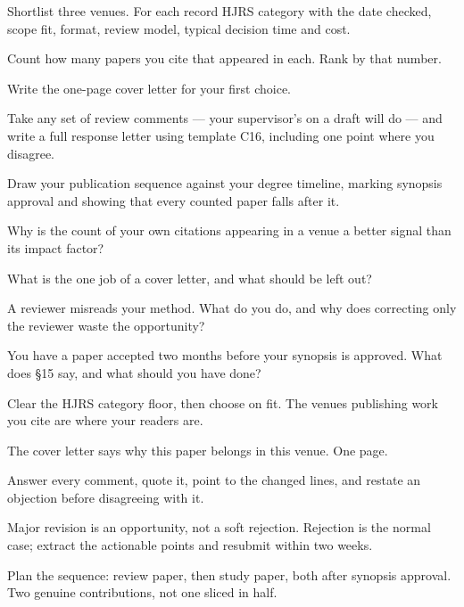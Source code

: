 \begin{lab}
\begin{tightnum}
  \item Shortlist three venues. For each record HJRS category with the date
    checked, scope fit, format, review model, typical decision time and cost.
  \item Count how many papers you cite that appeared in each. Rank by that
    number.
  \item Write the one-page cover letter for your first choice.
  \item Take any set of review comments --- your supervisor's on a draft will
    do --- and write a full response letter using template C16, including one
    point where you disagree.
  \item Draw your publication sequence against your degree timeline, marking
    synopsis approval and showing that every counted paper falls after it.
\end{tightnum}
\end{lab}

\begin{checkpoint}
\begin{tightnum}
  \item Why is the count of your own citations appearing in a venue a better
    signal than its impact factor?
  \item What is the one job of a cover letter, and what should be left out?
  \item A reviewer misreads your method. What do you do, and why does
    correcting only the reviewer waste the opportunity?
  \item You have a paper accepted two months before your synopsis is approved.
    What does \S15 say, and what should you have done?
\end{tightnum}
\end{checkpoint}

\begin{chaptersummary}
\begin{tight}
  \item Clear the HJRS category floor, then choose on fit. The venues
    publishing work you cite are where your readers are.
  \item The cover letter says why this paper belongs in this venue. One page.
  \item Answer every comment, quote it, point to the changed lines, and restate
    an objection before disagreeing with it.
  \item Major revision is an opportunity, not a soft rejection. Rejection is
    the normal case; extract the actionable points and resubmit within two
    weeks.
  \item Plan the sequence: review paper, then study paper, both after synopsis
    approval. Two genuine contributions, not one sliced in half.
\end{tight}
\end{chaptersummary}

